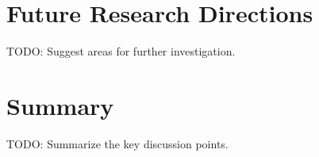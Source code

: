 \section{Future Research Directions}
TODO: Suggest areas for further investigation.

\section{Summary}
TODO: Summarize the key discussion points.

